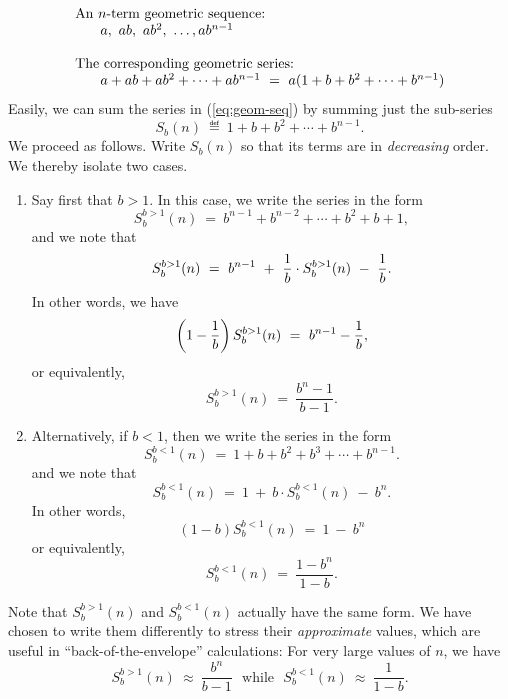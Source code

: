 {\begin{equation}
\label{eq:geom-seq}
\begin{array}{l}
\mbox{An $n$-term geometric sequence:} \\
\hspace*{.25in}a, \ ab, \ ab^2, \ \ldots, ab^{n-1} \\
\\
\mbox{The corresponding geometric series:} \\
\hspace*{.25in}a + ab + ab^2 + \cdots + ab^{n-1} \ = \
 a (1+ b + b^2 + \cdots + b^{n-1})
\end{array}
\end{equation}
Easily, we can sum the series in (\ref{eq:geom-seq}) by summing just
the sub-series
\begin{equation}
\label{eq:geom-series}
S_{b}(n) \ \eqdef \
1+ b + b^2 + \cdots + b^{n-1}.
\end{equation}
We proceed as follows.  Write $S_{b}(n)$ so that its terms are in {\em
  decreasing} order.  We thereby isolate two cases.
\begin{enumerate}
\item
Say first that $b > 1$.  In this case, we write the series in the form
\[ S^{b>1}_{b}(n) \ = \ b^{n-1} + b^{n-2} + \cdots + b^2 + b + 1, \]
and we note that
\[ S^{b>1}_{b}(n) \ = \
b^{n-1} \ + \ {1 \over b} \cdot S^{b>1}_{b}(n) \ - \ {1 \over b}. \]
In other words, we have
\[ \left( 1 - {1 \over b} \right)  S^{b>1}_{b}(n) \ = \ b^{n-1} - {1
  \over b}, \]
or equivalently,
\begin{equation}
\label{eq:geom-sum:b>1}
S^{b>1}_{b}(n) \ = \ \frac{b^{n}- 1}{b - 1}.
\end{equation}

\item
Alternatively, if $b < 1$, then we write the series in the form
\[ S^{b<1}_{b}(n) \ = \ 1+ b + b^2 + b^3 + \cdots + b^{n-1}. \]
and we note that
\[ S^{b<1}_{b}(n) \ = \
1 \ + \ b \cdot S^{b<1}_{b}(n) \ - \ b^n. \] 
In other words,
\[ (1-b) S^{b<1}_{b}(n) \ = \ 1 \ - \ b^n \]
or equivalently,
\begin{equation}
\label{eq:geom-sum:b<1}
S^{b<1}_{b}(n) \ = \ \frac{1 - b^n}{1-b}.
\end{equation}
\end{enumerate}

Note that $S^{b>1}_{b}(n)$ and $S^{b<1}_{b}(n)$ actually have the same
form.  We have chosen to write them differently to stress their {\em
  approximate} values, which are useful in ``back-of-the-envelope''
calculations:  For very large values of $n$, we have
\begin{equation}
\label{eq:geom-sum:approx}
S^{b>1}_{b}(n) \ \approx \ \frac{b^n}{b-1} \ \ \
\mbox{while} \ \ \
S^{b<1}_{b}(n) \ \approx \ \frac{1}{1-b} .
\end{equation}

}
